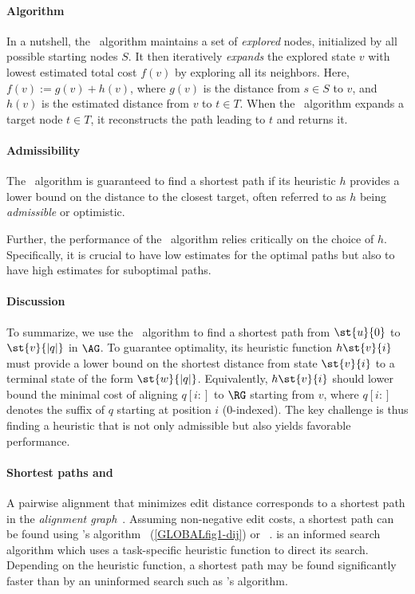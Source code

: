\paragraph{Algorithm}
% 
In a nutshell, the \A~algorithm maintains a set of \emph{explored} nodes,
initialized by all possible starting nodes $S$. It then iteratively
\emph{expands} the explored state $v$ with lowest estimated total cost $f(v)$ by
exploring all its neighbors. Here, $f(v) := g(v) + h(v)$, where $g(v)$ is the
distance from $s \in S$ to $v$, and $h(v)$ is the estimated distance from $v$ to
$t \in T$.
%
When the \A~algorithm expands a target node $t \in T$, it reconstructs the path
leading to $t$ and returns it.
%
\paragraph{Admissibility}
%
The \A~algorithm is guaranteed to find a shortest path if its heuristic $h$
provides a lower bound on the distance to the closest target, often referred to
as $h$ being \emph{admissible} or optimistic.

Further, the performance of the \A~algorithm relies critically on the choice of
$h$. Specifically, it is crucial to have low estimates for the optimal paths but
also to have high estimates for suboptimal paths.

\paragraph{Discussion}
%
To summarize, we use the \A~algorithm to find a shortest path from $\st{u}{0}$
to $\st{v}{|q|}$ in $\AG$. To guarantee optimality, its heuristic function
$h\st{v}{i}$ must provide a lower bound on the shortest distance from state
$\st{v}{i}$ to a terminal state of the form $\st{w}{\lvert q \rvert}$.
%
Equivalently, $h\st{v}{i}$ should lower bound the minimal cost of aligning
$q[i{:}]$ to $\RG$ starting from $v$, where $q[i{:}]$ denotes the suffix of $q$
starting at position $i$ ($0$-indexed).
%
The key challenge is thus finding a heuristic that is not only admissible but
also yields favorable performance.

\paragraph{Shortest paths and \A}
A pairwise alignment that minimizes edit distance corresponds to a shortest path
in the \emph{alignment graph}~\citep{vintsyuk1968speech,ukkonen1985algorithms}.
Assuming non-negative edit costs, a shortest path can be found using \dijkstra's
algorithm~\citep{ukkonen1985algorithms} (\cref{GLOBALfig1-dij}) or
\A~\citep{spouge1989speeding}. \A is an informed search algorithm which uses a
task-specific heuristic function to direct its search. Depending on the
heuristic function, a shortest path may be found significantly faster than by an
uninformed search such as \dijkstra's algorithm.

